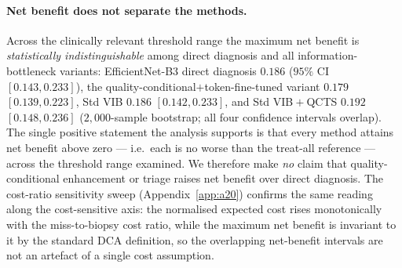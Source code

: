 \paragraph{Net benefit does not separate the methods.}
Across the clinically relevant threshold range the maximum net benefit is
\emph{statistically indistinguishable} among direct diagnosis and all
information-bottleneck variants: EfficientNet-B3 direct diagnosis $0.186$
($95\%$ CI $[0.143,0.233]$), the quality-conditional$+$token-fine-tuned variant
$0.179$ $[0.139,0.223]$, Std VIB $0.186$ $[0.142,0.233]$, and Std VIB${}+{}$QCTS
$0.192$ $[0.148,0.236]$ ($2{,}000$-sample bootstrap; all four confidence intervals
overlap). The single positive statement the analysis supports is that every method
attains net benefit above zero --- i.e.\ each is no worse than the treat-all reference
--- across the threshold range examined. We therefore make \emph{no} claim that
quality-conditional enhancement or triage raises net benefit over direct diagnosis.
The cost-ratio sensitivity sweep (Appendix~\ref{app:a20}) confirms the same reading
along the cost-sensitive axis: the normalised expected cost rises monotonically with
the miss-to-biopsy cost ratio, while the maximum net benefit is invariant to it by the
standard DCA definition, so the overlapping net-benefit intervals are not an artefact
of a single cost assumption.

